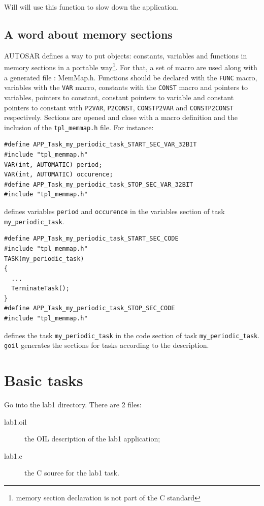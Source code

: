 \documentclass[11pt]{article}
\begin{document}
Will will use this function to slow down the application.

\subsection{A word about memory sections}

AUTOSAR defines a way to put objects: constants, variables and functions in memory sections in a portable way\footnote{memory section declaration is not part of the C standard}. For that, a set of macro are used along with a generated file : MemMap.h. Functions should be declared with the \lstinline{FUNC} macro, variables with the \lstinline{VAR} macro, constants with the \lstinline{CONST} macro and pointers to variables, pointers to constant, constant pointers to variable and constant pointers to constant with \lstinline{P2VAR}, \lstinline{P2CONST}, \lstinline{CONSTP2VAR} and \lstinline{CONSTP2CONST} respectively. Sections are opened and close with a macro definition and the inclusion of the \lstinline{tpl_memmap.h} file. For instance:

\begin{lstlisting}
#define APP_Task_my_periodic_task_START_SEC_VAR_32BIT
#include "tpl_memmap.h"
VAR(int, AUTOMATIC) period;
VAR(int, AUTOMATIC) occurence;
#define APP_Task_my_periodic_task_STOP_SEC_VAR_32BIT
#include "tpl_memmap.h"
\end{lstlisting}

defines variables \lstinline{period} and \lstinline{occurence} in the variables section of task \lstinline{my_periodic_task}.

\begin{lstlisting}
#define APP_Task_my_periodic_task_START_SEC_CODE
#include "tpl_memmap.h"
TASK(my_periodic_task)
{
  ...
  TerminateTask();
}
#define APP_Task_my_periodic_task_STOP_SEC_CODE
#include "tpl_memmap.h"
\end{lstlisting}

defines the task \lstinline{my_periodic_task} in the code section of task \lstinline{my_periodic_task}. \lstinline{goil} generates the sections for tasks according to the description.

\section{Basic tasks}

Go into the lab1 directory. There are 2 files:

\begin{description}
\item[lab1.oil] the OIL description of the lab1 application;
\item[lab1.c] the C source for the lab1 task.
\end{description}
\end{document}
